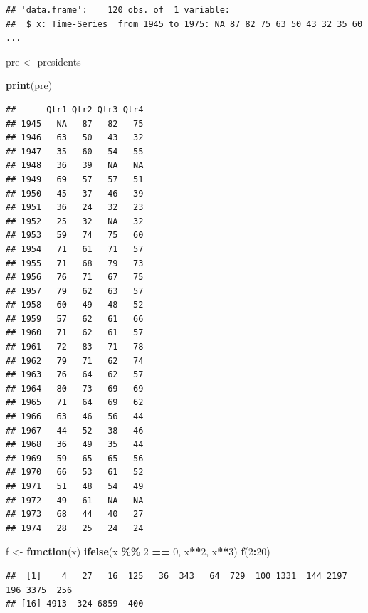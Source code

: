 \documentclass[
]{article}
\newenvironment{Shaded}{\begin{snugshade}}{\end{snugshade}}
\newcommand{\ControlFlowTok}[1]{\textcolor[rgb]{0.13,0.29,0.53}{\textbf{#1}}}
\newcommand{\DecValTok}[1]{\textcolor[rgb]{0.00,0.00,0.81}{#1}}
\newcommand{\FunctionTok}[1]{\textcolor[rgb]{0.13,0.29,0.53}{\textbf{#1}}}
\newcommand{\NormalTok}[1]{#1}
\newcommand{\OtherTok}[1]{\textcolor[rgb]{0.56,0.35,0.01}{#1}}
\newcommand{\SpecialCharTok}[1]{\textcolor[rgb]{0.81,0.36,0.00}{\textbf{#1}}}
\begin{document}
\begin{verbatim}
## 'data.frame':    120 obs. of  1 variable:
##  $ x: Time-Series  from 1945 to 1975: NA 87 82 75 63 50 43 32 35 60 ...
\end{verbatim}

\begin{Shaded}
\begin{Highlighting}[]
\NormalTok{pre }\OtherTok{\textless{}{-}}\NormalTok{ presidents}

\FunctionTok{print}\NormalTok{(pre)}
\end{Highlighting}
\end{Shaded}

\begin{verbatim}
##      Qtr1 Qtr2 Qtr3 Qtr4
## 1945   NA   87   82   75
## 1946   63   50   43   32
## 1947   35   60   54   55
## 1948   36   39   NA   NA
## 1949   69   57   57   51
## 1950   45   37   46   39
## 1951   36   24   32   23
## 1952   25   32   NA   32
## 1953   59   74   75   60
## 1954   71   61   71   57
## 1955   71   68   79   73
## 1956   76   71   67   75
## 1957   79   62   63   57
## 1958   60   49   48   52
## 1959   57   62   61   66
## 1960   71   62   61   57
## 1961   72   83   71   78
## 1962   79   71   62   74
## 1963   76   64   62   57
## 1964   80   73   69   69
## 1965   71   64   69   62
## 1966   63   46   56   44
## 1967   44   52   38   46
## 1968   36   49   35   44
## 1969   59   65   65   56
## 1970   66   53   61   52
## 1971   51   48   54   49
## 1972   49   61   NA   NA
## 1973   68   44   40   27
## 1974   28   25   24   24
\end{verbatim}

\begin{Shaded}
\begin{Highlighting}[]
\NormalTok{f }\OtherTok{\textless{}{-}} \ControlFlowTok{function}\NormalTok{(x) }\FunctionTok{ifelse}\NormalTok{(x }\SpecialCharTok{\%\%} \DecValTok{2} \SpecialCharTok{==} \DecValTok{0}\NormalTok{, x}\SpecialCharTok{**}\DecValTok{2}\NormalTok{, x}\SpecialCharTok{**}\DecValTok{3}\NormalTok{)}
\FunctionTok{f}\NormalTok{(}\DecValTok{2}\SpecialCharTok{:}\DecValTok{20}\NormalTok{)}
\end{Highlighting}
\end{Shaded}

\begin{verbatim}
##  [1]    4   27   16  125   36  343   64  729  100 1331  144 2197  196 3375  256
## [16] 4913  324 6859  400
\end{verbatim}
\end{document}
